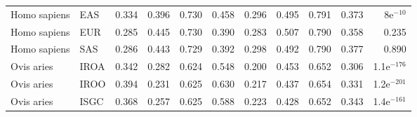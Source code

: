 \begin{center}
\begin{adjustbox}{width = 1\textwidth}
\begin{tabular}{llrrrrrrrrr}
        Homo sapiens &                       EAS &                              0.334 &                               0.396 &                 0.730 &                 0.458 &                              0.296 &                               0.495 &                 0.791 &                 0.373 &    8e$^{-10}$ \\
        Homo sapiens &                       EUR &                              0.285 &                               0.445 &                 0.730 &                 0.390 &                              0.283 &                               0.507 &                 0.790 &                 0.358 &         0.235 \\
        Homo sapiens &                       SAS &                              0.286 &                               0.443 &                 0.729 &                 0.392 &                              0.298 &                               0.492 &                 0.790 &                 0.377 &         0.890 \\
          Ovis aries &                      IROA &                              0.342 &                               0.282 &                 0.624 &                 0.548 &                              0.200 &                               0.453 &                 0.652 &                 0.306 & 1.1e$^{-176}$ \\
          Ovis aries &                      IROO &                              0.394 &                               0.231 &                 0.625 &                 0.630 &                              0.217 &                               0.437 &                 0.654 &                 0.331 & 1.2e$^{-201}$ \\
          Ovis aries &                      ISGC &                              0.368 &                               0.257 &                 0.625 &                 0.588 &                              0.223 &                               0.428 &                 0.652 &                 0.343 & 1.4e$^{-161}$ \\
\bottomrule
\end{tabular}
\end{adjustbox}
\end{center}
